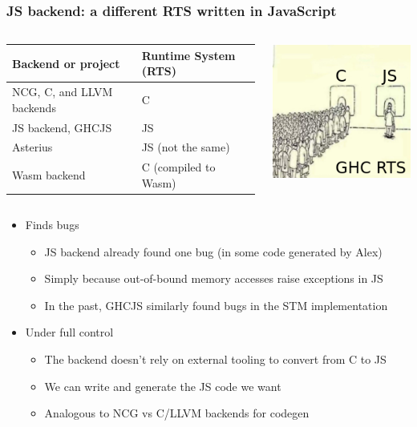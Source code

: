 \documentclass{beamer}
\begin{document}
\begin{frame}
\frametitle{JS backend: a different RTS written in JavaScript}

\begin{columns}

\begin{column}{0.7\textwidth}
\resizebox{8cm}{!}
{
\begin{tabular}{ll}
\hline
\textbf{Backend or project} & \textbf{Runtime System (RTS)} \\ \hline
NCG, C, and LLVM backends & C \\
JS backend, GHCJS         & JS \\
Asterius                  & JS (not the same) \\
Wasm backend & C (compiled to Wasm) \\ \hline
\end{tabular}
}
\end{column}

\begin{column}{0.2\textwidth}
\includegraphics[scale=0.3]{images/queue_rts.png}
\end{column}
\end{columns}

\vspace{1cm}

\begin{itemize}
\item Finds bugs
\begin{itemize}
\item JS backend already found one bug (in some code generated by Alex)
\item Simply because out-of-bound memory accesses raise exceptions in JS
\item In the past, GHCJS similarly found bugs in the STM implementation
\end{itemize}
\item Under full control
\begin{itemize}
\item The backend doesn’t rely on external tooling to convert from C to JS
\item We can write and generate the JS code we want
\item Analogous to NCG vs C/LLVM backends for codegen
\end{itemize}
\end{itemize}
\end{frame}
\end{document}
